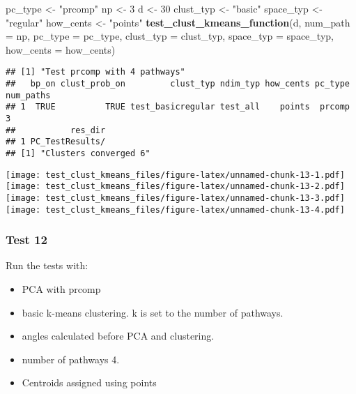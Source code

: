\documentclass[
]{article}
\newenvironment{Shaded}{\begin{snugshade}}{\end{snugshade}}
\newcommand{\AttributeTok}[1]{\textcolor[rgb]{0.13,0.29,0.53}{#1}}
\newcommand{\DecValTok}[1]{\textcolor[rgb]{0.00,0.00,0.81}{#1}}
\newcommand{\FunctionTok}[1]{\textcolor[rgb]{0.13,0.29,0.53}{\textbf{#1}}}
\newcommand{\NormalTok}[1]{#1}
\newcommand{\OtherTok}[1]{\textcolor[rgb]{0.56,0.35,0.01}{#1}}
\newcommand{\StringTok}[1]{\textcolor[rgb]{0.31,0.60,0.02}{#1}}
\providecommand{\tightlist}{%
  \setlength{\itemsep}{0pt}\setlength{\parskip}{0pt}}
\begin{document}
\begin{Shaded}
\begin{Highlighting}[]
\NormalTok{pc\_type }\OtherTok{\textless{}{-}} \StringTok{"prcomp"}
\NormalTok{np }\OtherTok{\textless{}{-}} \DecValTok{3}
\NormalTok{d }\OtherTok{\textless{}{-}} \DecValTok{30}
\NormalTok{clust\_typ }\OtherTok{\textless{}{-}} \StringTok{"basic"}
\NormalTok{space\_typ }\OtherTok{\textless{}{-}} \StringTok{"regular"}
\NormalTok{how\_cents }\OtherTok{\textless{}{-}} \StringTok{"points"}
\FunctionTok{test\_clust\_kmeans\_function}\NormalTok{(d,}
                           \AttributeTok{num\_path =}\NormalTok{ np,}
                           \AttributeTok{pc\_type =}\NormalTok{ pc\_type,}
                           \AttributeTok{clust\_typ =}\NormalTok{ clust\_typ,}
                           \AttributeTok{space\_typ =}\NormalTok{ space\_typ,}
                           \AttributeTok{how\_cents =}\NormalTok{ how\_cents)}
\end{Highlighting}
\end{Shaded}

\begin{verbatim}
## [1] "Test prcomp with 4 pathways"
##   bp_on clust_prob_on         clust_typ ndim_typ how_cents pc_type num_paths
## 1  TRUE          TRUE test_basicregular test_all    points  prcomp         3
##           res_dir
## 1 PC_TestResults/
## [1] "Clusters converged 6"
\end{verbatim}

\texttt{[image: test\_clust\_kmeans\_files/figure-latex/unnamed-chunk-13-1.pdf]}
\texttt{[image: test\_clust\_kmeans\_files/figure-latex/unnamed-chunk-13-2.pdf]}
\texttt{[image: test\_clust\_kmeans\_files/figure-latex/unnamed-chunk-13-3.pdf]}
\texttt{[image: test\_clust\_kmeans\_files/figure-latex/unnamed-chunk-13-4.pdf]}

\hypertarget{test-12}{%
\subsubsection{Test 12}\label{test-12}}

Run the tests with:

\begin{itemize}
\tightlist
\item
  PCA with prcomp
\item
  basic k-means clustering. k is set to the number of pathways.
\item
  angles calculated before PCA and clustering.
\item
  number of pathways 4.
\item
  Centroids assigned using points
\end{itemize}
\end{document}

